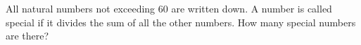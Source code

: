 All natural numbers not exceeding $60$ are written down. A number is called special if it divides the sum of all the other numbers. How many special numbers are there?
